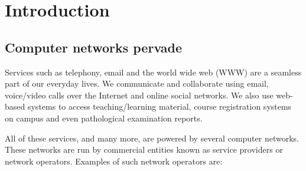 \chapter{Introduction}
\label{chap:intro}

\section{Computer networks pervade}
Services such as telephony, email and the world wide web (WWW) are a seamless part of our everyday lives. We communicate and collaborate using email, voice/video calls over the Internet and online social networks. We also use web-based systems to access teaching/learning material, course registration systems on campus and even pathological examination reports. 

All of these services, and many more, are powered by several computer networks. These networks are run by commercial entities known as service providers or network operators. Examples of such network operators are: 

